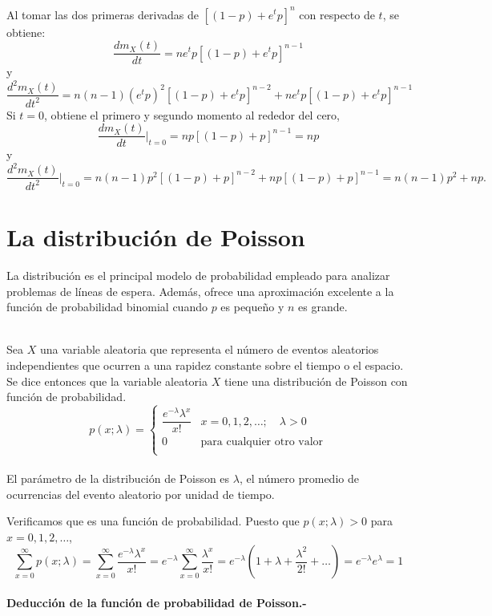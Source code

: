 Al tomar las dos primeras derivadas de $[(1-p)+e^tp]^n$ con respecto de $t$, se obtiene:
$$\dfrac{dm_X(t)}{dt} = ne^t p [(1-p)+e^t p]^{n-1}$$
y
$$\dfrac{d^2m_X (t)}{dt^2}=n(n-1)(e^t p)^2[(1-p)+e^tp]^{n-2}+ne^t p[(1-p)+e^t p]^{n-1}$$
Si $t=0$, obtiene el primero y segundo momento al rededor del cero,
$$\dfrac{dm_X(t)}{dt}\bigg|_{t=0} = np[(1-p)+p]^{n-1} = np$$
y
$$\dfrac{d^2m_X(t)}{dt^2}\bigg|_{t=0} = n(n-1)p^2[(1-p)+p]^{n-2} + np[(1-p)+p]^{n-1}=n(n-1)p^2 + np.$$

\section{La distribución de Poisson}
La distribución es el principal modelo de probabilidad empleado para analizar problemas de líneas de espera. Además, ofrece una aproximación excelente a la función de probabilidad binomial cuando $p$ es pequeño y $n$ es grande.\\\\

\begin{tcolorbox}[colback=white]
    \begin{def.}
	Sea $X$ una variable aleatoria que representa el número de eventos aleatorios independientes que ocurren a una rapidez constante sobre el tiempo o el espacio. Se dice entonces que la variable aleatoria $X$ tiene una distribución de Poisson con función de probabilidad.
	$$p(x;\lambda)=\left\{\begin{array}{ll}
		\dfrac{e^{-\lambda}\lambda^x}{x!} & x=0,1,2,\ldots; \quad \lambda > 0\\
		0&\mbox{para cualquier otro valor}\\
	\end{array}\right.$$\\
	El parámetro de la distribución de Poisson es $\lambda$, el número promedio de ocurrencias del evento aleatorio por unidad de tiempo.
    \end{def.}
\end{tcolorbox}
Verificamos que es una función de probabilidad. Puesto que $p(x;\lambda)>0$ para $x=0,1,2,\ldots$,
$$\sum_{x=0}^\infty p(x;\lambda) = \sum_{x=0}^\infty \dfrac{e^{-\lambda}\lambda^x}{x!} = e^{-\lambda}\sum_{x=0}^\infty \dfrac{\lambda^x}{x!}=e^{-\lambda}\left(1+\lambda + \dfrac{\lambda^2}{2!}+\ldots\right) = e^{-\lambda}e^{\lambda}=1$$\\

\textbf{Deducción de la función de probabilidad de Poisson.-}\\\\

